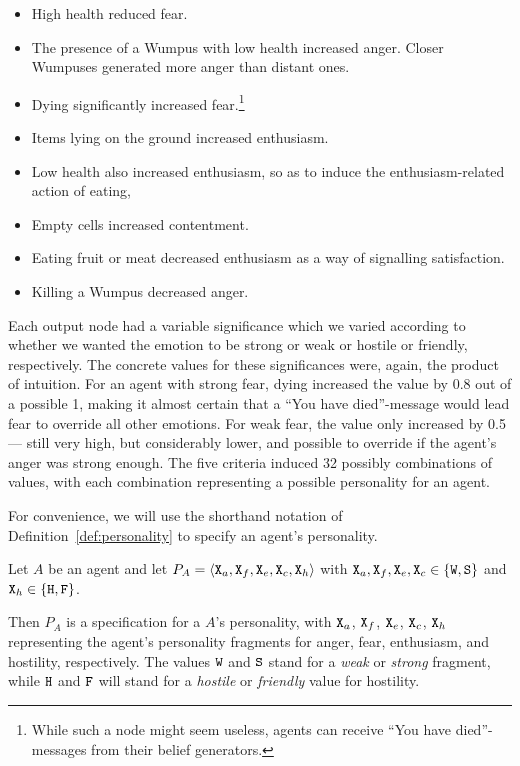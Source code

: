 \begin{itemize}
	\item High health reduced fear.
	\item The presence of a Wumpus with low health increased anger. Closer Wumpuses generated more anger than distant ones.
	\item Dying significantly increased fear.\footnote{While such a node might seem useless, agents can receive ``You have died''-messages from their belief generators.}
	\item Items lying on the ground increased enthusiasm.
	\item Low health also increased enthusiasm, so as to induce the enthusiasm-related action of eating,
	\item Empty cells increased contentment.
	\item Eating fruit or meat decreased enthusiasm as a way of signalling satisfaction.
	\item Killing a Wumpus decreased anger.
\end{itemize}

Each output node had a variable significance which we varied according to whether we wanted the emotion to be strong or weak or hostile or friendly, respectively. The concrete values for these significances were, again, the product of intuition. For an agent with strong fear, dying increased the value by 0.8 out of a possible 1, making it almost certain that a ``You have died''-message would lead fear to override all other emotions. For weak fear, the value only increased by 0.5 --- still very high, but considerably lower, and possible to override if the agent's anger was strong enough. The five criteria induced 32 possibly combinations of values, with each combination representing a possible personality for an agent.

For convenience, we will use the shorthand notation of Definition~\ref{def:personality} to specify an agent's personality.

\begin{definition}\label{def:personality}
   Let $A$ be an agent and let $P_A = \langle \mathtt{X}_a, \mathtt{X}_f, \mathtt{X}_e, \mathtt{X}_c, \mathtt{X}_h \rangle$ with $\mathtt{X}_a, \mathtt{X}_f, \mathtt{X}_e, \mathtt{X}_c \in \{ \mathtt{W}, \mathtt{S} \}$ and $\mathtt{X}_h \in \{ \mathtt{H}, \mathtt{F} \}$.
   
   Then $P_A$ is a specification for a $A$'s personality, with $\mathtt{X}_a$, $\mathtt{X}_f$, $\mathtt{X}_e$, $\mathtt{X}_c$, $\mathtt{X}_h$ representing the agent's personality fragments for anger, fear, enthusiasm, and hostility, respectively. The values $\mathtt{W}$ and $\mathtt{S}$ stand for a \emph{weak} or \emph{strong} fragment, while $\mathtt{H}$ and $\mathtt{F}$ will stand for a \emph{hostile} or \emph{friendly} value for hostility.
\end{definition}

